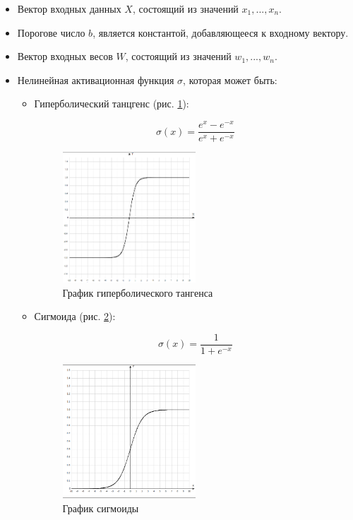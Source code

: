 \begin{itemize}
	\item Вектор входных данных $X$, состоящий из значений $x_1, ..., x_n$.
	\item Порогове число $b$, является константой, добавляющееся к входному вектору.
	\item Вектор входных весов $W$, состоящий из значений $w_1, ..., w_n$.
	\item Нелинейная активационная функция $\sigma$, которая может быть:
	\begin{itemize}
		\item Гиперболический танцгенс (рис. \ref{anal:th}):
		
		\begin{equation}
			\sigma(x) = \frac{e^x - e^{-x}}{e^x + e^{-x}}
		\end{equation}
		
		\begin{figure}
			\centering
			\includegraphics[width=0.5\textwidth]{inc/img/th.png}
			\caption{График гиперболического тангенса}
			\label{anal:th}
		\end{figure}
		
		\item Сигмоида (рис. \ref{anal:sigm}):
		
		\begin{equation}
		\sigma(x)=\frac{1}{1+e^{-x}}
		\end{equation}
		
		\begin{figure}
			\centering
			\includegraphics[width=0.5\textwidth]{inc/img/sigmoid.png}
			\caption{График сигмоиды}
			\label{anal:sigm}
		\end{figure}
		

\end{itemize}
\end{itemize}
